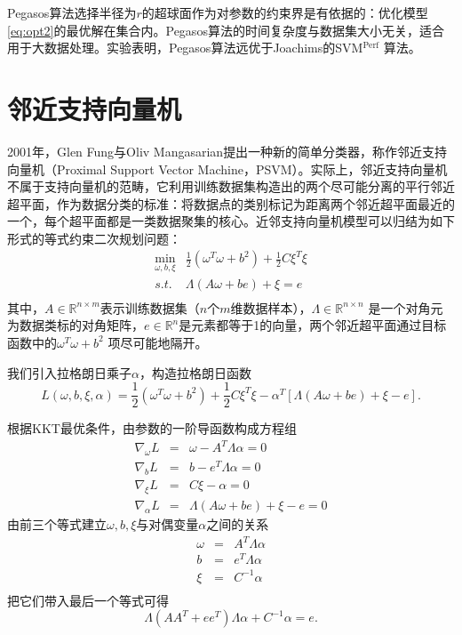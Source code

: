 Pegasos算法选择半径为$r$的超球面作为对参数的约束界是有依据的：优化模型\eqref{eq:opt2}的最优解在集合内。Pegasos算法的时间复杂度与数据集大小无关，适合用于大数据处理。实验表明，Pegasos算法远优于Joachims的SVM$^{\textrm{Perf}}$ 算法\cite{joachims2006training}。

\section{邻近支持向量机}
2001年，Glen Fung与Oliv Mangasarian\cite{fung2001proximal}提出一种新的简单分类器，称作邻近支持向量机（Proximal Support Vector Machine，PSVM）。实际上，邻近支持向量机不属于支持向量机的范畴，它利用训练数据集构造出的两个尽可能分离的平行邻近超平面，作为数据分类的标准：将数据点的类别标记为距离两个邻近超平面最近的一个，每个超平面都是一类数据聚集的核心。近邻支持向量机模型可以归结为如下形式的等式约束二次规划问题：
\begin{equation}
    \begin{array}{ll}
      \min\limits_{\omega,b,\xi} & \frac{1}{2} (\omega^T \omega + b^2) + \frac{1}{2} C \xi^T \xi\\
      \textit{s.t.} & \Lambda (A\omega + b e) + \xi = e \\
    \end{array}
\end{equation}
其中，$A\in \mathbb R^{n\times m}$表示训练数据集（$n$个$m$维数据样本），$\Lambda\in \mathbb R^{n\times n}$ 是一个对角元为数据类标的对角矩阵，$e\in \mathbb R^n$是元素都等于1的向量，两个邻近超平面通过目标函数中的$\omega^T \omega + b^2$ 项尽可能地隔开。

我们引入拉格朗日乘子$\alpha$，构造拉格朗日函数
\begin{equation}
    L(\omega, b, \xi, \alpha) = \frac{1}{2} (\omega^T \omega + b^2) + \frac{1}{2} C \xi^T \xi - \alpha^T [\Lambda (A\omega + b e) + \xi - e].
\end{equation}

根据KKT最优条件，由参数的一阶导函数构成方程组
\begin{eqnarray}
  \nabla_\omega L &=& \omega - A^T \Lambda \alpha = 0 \\
  \nabla_b L &=& b - e^T \Lambda \alpha = 0\\
  \nabla_\xi L &=& C\xi - \alpha = 0\\
  \nabla_\alpha L &=& \Lambda (A\omega + b e) + \xi - e = 0
\end{eqnarray}
由前三个等式建立$\omega,b,\xi$与对偶变量$\alpha$之间的关系
\begin{eqnarray}
  \omega & = & A^T \Lambda \alpha \\
  b &=& e^T \Lambda \alpha\\
  \xi &=& C^{-1} \alpha\\
\end{eqnarray}
把它们带入最后一个等式可得
\begin{equation}
    \Lambda (A A^T + ee^T )\Lambda \alpha + C^{-1} \alpha = e.
\end{equation}

